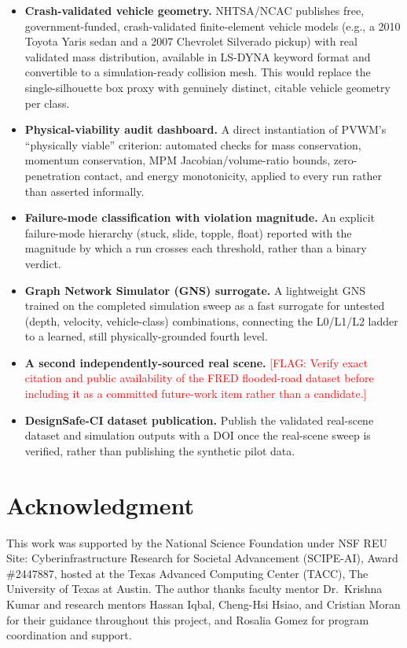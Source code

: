 \documentclass[conference]{IEEEtran}
\newcommand{\FLAG}[1]{\textcolor{red}{[FLAG: #1]}}
\begin{document}
\begin{itemize}
\item \textbf{Crash-validated vehicle geometry.} NHTSA/NCAC publishes free, government-funded, crash-validated finite-element vehicle models (e.g., a 2010 Toyota Yaris sedan and a 2007 Chevrolet Silverado pickup) with real validated mass distribution, available in LS-DYNA keyword format and convertible to a simulation-ready collision mesh. This would replace the single-silhouette box proxy with genuinely distinct, citable vehicle geometry per class.
\item \textbf{Physical-viability audit dashboard.} A direct instantiation of PVWM's ``physically viable'' criterion: automated checks for mass conservation, momentum conservation, MPM Jacobian/volume-ratio bounds, zero-penetration contact, and energy monotonicity, applied to every run rather than asserted informally.
\item \textbf{Failure-mode classification with violation magnitude.} An explicit failure-mode hierarchy (stuck, slide, topple, float) reported with the magnitude by which a run crosses each threshold, rather than a binary verdict.
\item \textbf{Graph Network Simulator (GNS) surrogate.} A lightweight GNS trained on the completed simulation sweep as a fast surrogate for untested (depth, velocity, vehicle-class) combinations, connecting the L0/L1/L2 ladder to a learned, still physically-grounded fourth level.
\item \textbf{A second independently-sourced real scene.} \FLAG{Verify exact citation and public availability of the FRED flooded-road dataset before including it as a committed future-work item rather than a candidate.}
\item \textbf{DesignSafe-CI dataset publication.} Publish the validated real-scene dataset and simulation outputs with a DOI once the real-scene sweep is verified, rather than publishing the synthetic pilot data.
\end{itemize}

\section*{Acknowledgment}
This work was supported by the National Science Foundation under NSF REU Site: Cyberinfrastructure Research for Societal Advancement (SCIPE-AI), Award \#2447887, hosted at the Texas Advanced Computing Center (TACC), The University of Texas at Austin. The author thanks faculty mentor Dr.\ Krishna Kumar and research mentors Hassan Iqbal, Cheng-Hsi Hsiao, and Cristian Moran for their guidance throughout this project, and Rosalia Gomez for program coordination and support.
\end{document}
